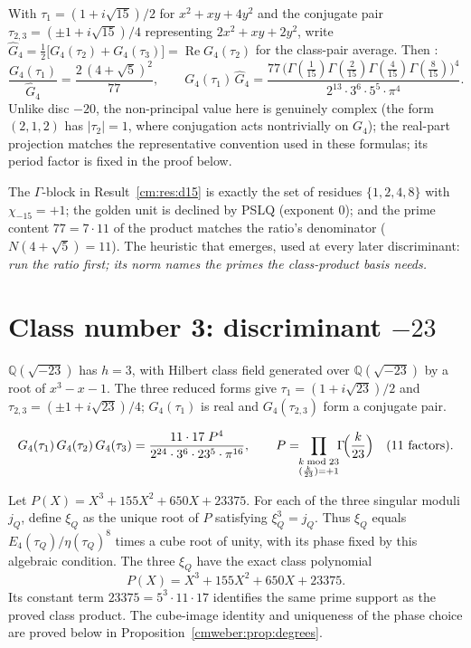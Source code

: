 \begin{theorem}[disc $-15$]\label{cm:res:d15}
With $\tau_1=(1+i\sqrt{15})/2$ for $x^2+xy+4y^2$ and the conjugate pair
$\tau_{2,3}=(\pm1+i\sqrt{15})/4$ representing $2x^2+xy+2y^2$, write
$\widehat G_4=\tfrac12\bigl[G_4(\tau_2)+G_4(\tau_3)\bigr]
=\operatorname{Re}G_4(\tau_2)$ for the class-pair average. Then
:
\[
\frac{G_4(\tau_1)}{\widehat G_4}=\frac{2\,(4+\sqrt5)^2}{77},\qquad
G_4(\tau_1)\,\widehat G_4
=\frac{77\,\bigl(\Gamma(\tfrac1{15})\Gamma(\tfrac2{15})\Gamma(\tfrac4{15})
\Gamma(\tfrac8{15})\bigr)^4}{2^{13}\cdot3^6\cdot5^5\cdot\pi^4}.
\]
Unlike disc $-20$, the non-principal value here is genuinely complex (the form
$(2,1,2)$ has $|\tau_2|=1$, where conjugation acts nontrivially on $G_4$); the
real-part projection matches the representative convention used in these
formulas; its period factor is fixed in the proof below.
\end{theorem}

The $\Gamma$-block in Result~\ref{cm:res:d15} is exactly the set of residues
$\{1,2,4,8\}$ with $\chi_{-15}=+1$; the golden unit is declined by PSLQ (exponent $0$); and
the prime content $77=7\cdot11$ of the product matches the ratio's denominator
($N(4+\sqrt5)=11$). The heuristic that emerges, used at every later discriminant:
\emph{run the ratio first; its norm names the primes the class-product basis needs.}

\section{Class number 3: discriminant \texorpdfstring{$-23$}{-23}}\label{cm:sec:h3}

$\mathbb{Q}(\sqrt{-23})$ has $h=3$, with Hilbert class field generated over $\mathbb Q(\sqrt{-23})$ by a root of $x^3-x-1$. The three reduced forms give $\tau_1=(1+i\sqrt{23})/2$ and
$\tau_{2,3}=(\pm1+i\sqrt{23})/4$; $G_4(\tau_1)$ is real and $G_4(\tau_{2,3})$ form a
conjugate pair.

\begin{theorem}\label{cm:res:d23}
\[
G_4(\tau_1)\,G_4(\tau_2)\,G_4(\tau_3)
=\frac{11\cdot17\;P^4}{2^{24}\cdot3^6\cdot23^5\cdot\pi^{16}},\qquad
P=\!\!\prod_{\substack{k\bmod 23\\ (\frac{k}{23})=+1}}\!\!\Gamma\!\Bigl(\frac{k}{23}\Bigr)
\quad\text{(11 factors)}.
\]
\end{theorem}

\begin{theorem}\label{cm:res:d23poly}
Let $P(X)=X^3+155X^2+650X+23375$. For each of the three singular
moduli $j_Q$, define $\xi_Q$ as the unique root of $P$ satisfying
$\xi_Q^3=j_Q$. Thus $\xi_Q$ equals $E_4(\tau_Q)/\eta(\tau_Q)^8$
times a cube root of unity, with its phase fixed by this algebraic
condition. The three $\xi_Q$ have the exact class polynomial
\[
 P(X)=X^3+155X^2+650X+23375.
\]
Its constant term $23375=5^3\cdot11\cdot17$ identifies the same prime
support as the proved class product. The cube-image identity and uniqueness
of the phase choice are proved below in Proposition~\ref{cmweber:prop:degrees}.
\end{theorem}

